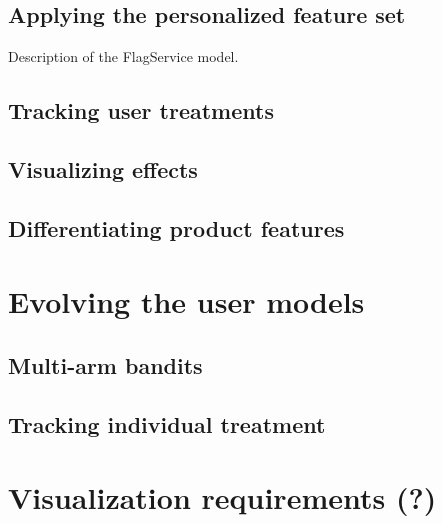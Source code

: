 
\subsection{Applying the personalized feature set} %
\label{sub:applying_the_personalized_feature_set}

Description of the FlagService model.


\subsection{Tracking user treatments} %
\label{sub:tracking_user_treatments}


\subsection{Visualizing effects} %
\label{sub:visualizing_effects}



\subsection{Differentiating product features} %
\label{sec:differentiating_product_features}


\section{Evolving the user models} %
\label{sec:evolving_the_user_models}

\subsection{Multi-arm bandits}

\subsection{Tracking individual treatment}


\section{Visualization requirements (?)} %
\label{sec:visualization_requirements}

